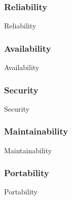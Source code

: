 \subsubsection{Reliability}
{Reliability}

\subsubsection{Availability}
{Availability}

\subsubsection{Security}
{Security}

\subsubsection{Maintainability}
{Maintainability}

\subsubsection{Portability}
{Portability}